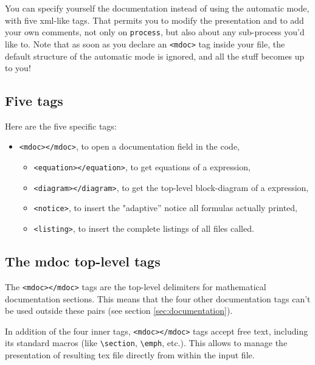 \documentclass[a4paper]{book}
\begin{document}
You can specify yourself the documentation instead of using the automatic mode, with five xml-like tags. That permits you to modify the presentation and to add your own comments, not only on \lstinline!process!, but also about any sub-process you'd like to. Note that as soon as you declare an \lstinline!<mdoc>! tag inside your \faust file, the default structure of the automatic mode is ignored, and all the \latex stuff becomes up to you!

\subsection{Five tags}
\label{sec:five-tags}

Here are the five specific tags:
\begin{itemize}
\item \lstinline!<mdoc></mdoc>!, to open a documentation field in the \faust code,
  \begin{itemize}
  \item \lstinline!<equation></equation>!, to get equations of a \faust expression,
  \item \lstinline!<diagram></diagram>!, to get the top-level block-diagram of a \faust expression,
  \item \lstinline!<notice>!, to insert the "adaptive'' notice all formulas actually printed,
  \item \lstinline!<listing>!, to insert the complete listings of all \faust files called.
  \end{itemize}
\end{itemize}

\subsection{The mdoc top-level tags}
\label{sec:mdoc-tag}

The \lstinline!<mdoc></mdoc>! tags are the top-level delimiters for \faust mathematical documentation sections. This means that the four other documentation tags can't be used outside these pairs (see section \ref{sec:documentation}).

In addition of the four inner tags, \lstinline!<mdoc></mdoc>! tags accept free \latex text, including its standard macros (like \lstinline!\section!, \lstinline!\emph!, etc.). This allows to manage the presentation of resulting tex file directly from within the input \faust file. 
\end{document}
